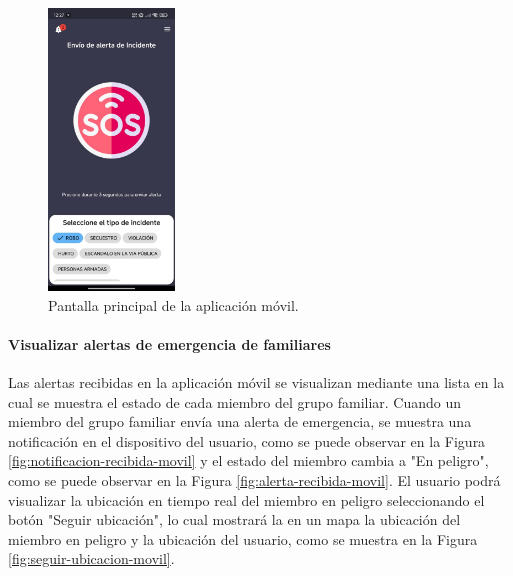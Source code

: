 \begin{figure}[H]
    \centering
    \includegraphics[width=0.3\textwidth]{chapters/III-resultados-y-discusion/resources/images/pantalla-principal-movil.png}
    \caption{Pantalla principal de la aplicación móvil.}
    \label{fig:pantalla-principal-movil}
\end{figure}

\paragraph{Visualizar alertas de emergencia de familiares}
Las alertas recibidas en la aplicación móvil se visualizan mediante una lista en la cual se muestra el estado de cada miembro del
grupo familiar. Cuando un miembro del grupo familiar envía una alerta de emergencia, se muestra una notificación en el dispositivo
del usuario, como se puede observar en la Figura \ref{fig:notificacion-recibida-movil} y el estado del miembro cambia a "En peligro", como se
puede observar en la Figura \ref{fig:alerta-recibida-movil}. El usuario podrá visualizar la ubicación en tiempo real del miembro en
peligro seleccionando el botón "Seguir ubicación", lo cual mostrará la en un mapa la ubicación del miembro en peligro y la ubicación
del usuario, como se muestra en la Figura \ref{fig:seguir-ubicacion-movil}.

